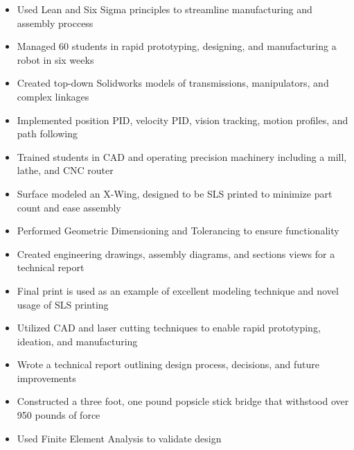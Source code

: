 \documentclass{resume}
\begin{document}
\begin{itemize}
  \item Used Lean and Six Sigma principles to streamline manufacturing and assembly proccess
  \item Managed 60 students in rapid prototyping, designing, and manufacturing a robot in six weeks
  \item Created top-down Solidworks models of transmissions, manipulators, and complex linkages
  \item Implemented position PID, velocity PID, vision tracking, motion profiles, and path following
  \item Trained students in CAD and operating precision machinery including a mill, lathe, and CNC router
\end{itemize}

\begin{itemize}
  \item Surface modeled an X-Wing, designed to be SLS printed to minimize part count and ease assembly
  \item Performed Geometric Dimensioning and Tolerancing to ensure functionality
  \item Created engineering drawings, assembly diagrams, and sections views for a technical report
  \item Final print is used as an example of excellent modeling technique and novel usage of SLS printing
\end{itemize}

\begin{itemize}
  \item Utilized CAD and laser cutting techniques to enable rapid prototyping, ideation, and manufacturing
  \item Wrote a technical report outlining design process, decisions, and future improvements
\end{itemize}

\begin{itemize}
  \item Constructed a three foot, one pound popsicle stick bridge that withstood over 950 pounds of force
  \item Used Finite Element Analysis to validate design
\end{itemize}
\end{document}
